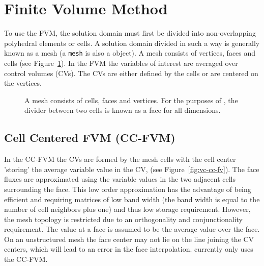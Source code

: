\section{Finite Volume Method}

To use the FVM, the solution domain must first be divided into
non-overlapping polyhedral elements or cells. A solution domain
divided in such a way is generally known as a mesh (a \texttt{mesh} is
also a \FiPy{} object). A mesh consists of vertices, faces and cells
(see Figure~\ref{fig:meshcartoon}).  In the FVM the variables of
interest are averaged over control volumes (CVs). The CVs are either
defined by the cells or are centered on the vertices.

\begin{figure}
 \begin{center}
 \caption{A mesh consists of cells, faces and vertices. For the
 purposes of \FiPy{}, the divider between two cells is known as a face
 for all dimensions.}  \label{fig:meshcartoon} \end{center}
\end{figure}

\subsection{Cell Centered FVM (CC-FVM)}

In the CC-FVM the CVs are formed by the mesh cells with the cell
center 'storing' the average variable value in the CV, (see
Figure~\ref{fig:vc-cc-fv}). The face fluxes are approximated using the
variable values in the two adjacent cells surrounding the face. This
low order approximation has the advantage of being efficient and
requiring matrices of low band width (the band width is equal to the
number of cell neighbors plus one) and thus low storage
requirement. However, the mesh topology is restricted due to an
orthogonality and conjunctionality requirement. The value at a face is
assumed to be the average value over the face. On an unstructured mesh
the face center may not lie on the line joining the CV centers, which
will lead to an error in the face interpolation. \FiPy{} currently
only uses the CC-FVM.

